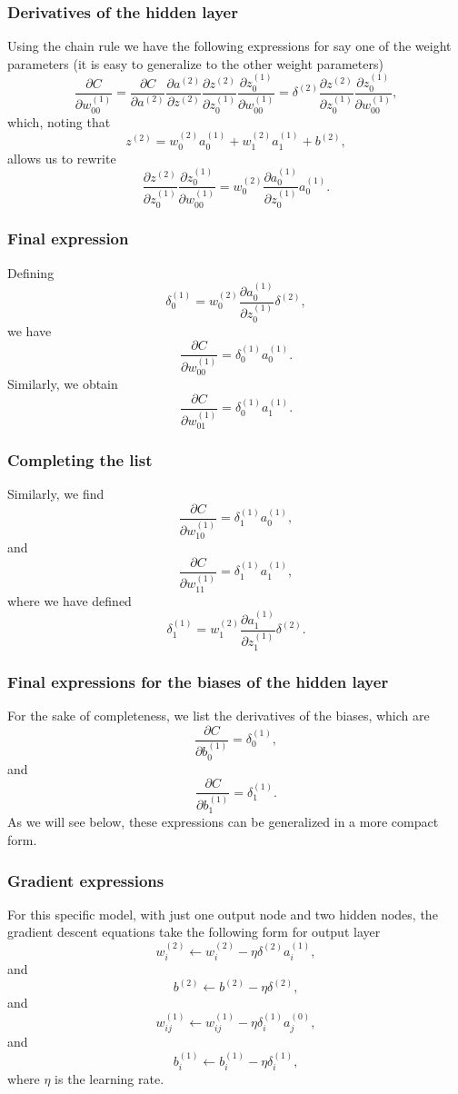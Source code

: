 \documentclass{beamer}
\begin{document}
\begin{frame}
\frametitle{Derivatives of the hidden layer}

Using the chain rule we have the following expressions for say one of the weight parameters (it is easy to generalize to the other weight parameters)
\[
\frac{\partial C}{\partial w_{00}^{(1)}}=\frac{\partial C}{\partial a^{(2)}}\frac{\partial a^{(2)}}{\partial z^{(2)}}
\frac{\partial z^{(2)}}{\partial z_0^{(1)}}\frac{\partial z_0^{(1)}}{\partial w_{00}^{(1)}}=    \delta^{(2)}\frac{\partial z^{(2)}}{\partial z_0^{(1)}}\frac{\partial z_0^{(1)}}{\partial w_{00}^{(1)}},
\]
which, noting that
\[
z^{(2)} =w_0^{(2)}a_0^{(1)}+w_1^{(2)}a_1^{(1)}+b^{(2)},
\]
allows us to rewrite 
\[
\frac{\partial z^{(2)}}{\partial z_0^{(1)}}\frac{\partial z_0^{(1)}}{\partial w_{00}^{(1)}}=w_0^{(2)}\frac{\partial a_0^{(1)}}{\partial z_0^{(1)}}a_0^{(1)}.
\]
\end{frame}

\begin{frame}
\frametitle{Final expression}

Defining
\[
\delta_0^{(1)}=w_0^{(2)}\frac{\partial a_0^{(1)}}{\partial z_0^{(1)}}\delta^{(2)},
\]
we have 
\[
\frac{\partial C}{\partial w_{00}^{(1)}}=\delta_0^{(1)}a_0^{(1)}.
\]
Similarly, we obtain
\[
\frac{\partial C}{\partial w_{01}^{(1)}}=\delta_0^{(1)}a_1^{(1)}.
\]
\end{frame}

\begin{frame}
\frametitle{Completing the list}

Similarly, we find
\[
\frac{\partial C}{\partial w_{10}^{(1)}}=\delta_1^{(1)}a_0^{(1)},
\]
and 
\[
\frac{\partial C}{\partial w_{11}^{(1)}}=\delta_1^{(1)}a_1^{(1)},
\]
where we have defined 
\[
\delta_1^{(1)}=w_1^{(2)}\frac{\partial a_1^{(1)}}{\partial z_1^{(1)}}\delta^{(2)}.
\]
\end{frame}

\begin{frame}
\frametitle{Final expressions for the biases of the hidden layer}

For the sake of completeness, we list the derivatives of the biases, which are
\[
\frac{\partial C}{\partial b_{0}^{(1)}}=\delta_0^{(1)},
\]
and
\[
\frac{\partial C}{\partial b_{1}^{(1)}}=\delta_1^{(1)}.
\]
As we will see below, these expressions can be generalized in a more compact form.
\end{frame}

\begin{frame}
\frametitle{Gradient expressions}

For this specific model, with just one output node and two hidden
nodes, the gradient descent equations take the following form for output layer
\[
w_{i}^{(2)}\leftarrow w_{i}^{(2)}- \eta \delta^{(2)} a_{i}^{(1)},
\]
and
\[
b^{(2)} \leftarrow b^{(2)}-\eta \delta^{(2)},
\]
and
\[
w_{ij}^{(1)}\leftarrow w_{ij}^{(1)}- \eta \delta_{i}^{(1)} a_{j}^{(0)},
\]
and
\[
b_{i}^{(1)} \leftarrow b_{i}^{(1)}-\eta \delta_{i}^{(1)},
\]
where $\eta$ is the learning rate.
\end{frame}
\end{document}
